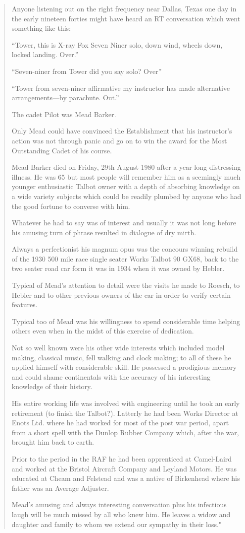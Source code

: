 \begin{quotation}
Anyone listening out on the right frequency near Dallas, Texas one day in the early nineteen forties might have heard an RT conversation which went something like this:

``Tower, this is X-ray Fox Seven Niner solo, down wind, wheels down, locked landing. Over.''

``Seven-niner from Tower did you say solo? Over''

``Tower from seven-niner affirmative my instructor has made alternative arrangements---by parachute. Out.''

The cadet Pilot was Mead Barker.

Only Mead could have convinced the Establishment that his instructor's action was not through panic and go on to win the award for the Most Outstanding Cadet of his course.

Mead Barker died on Friday, 29th August 1980 after a year long distressing illness. He was 65 but most people will remember him as a seemingly much younger enthusiastic Talbot owner with a depth of absorbing knowledge on a wide variety subjects which could be readily plumbed by anyone who had the good fortune to converse with him.

Whatever he had to say was of interest and usually it was not long before his amusing turn of phrase resulted in dialogue of dry mirth.

Always a perfectionist his magnum opus was the concours winning rebuild of the 1930 500 mile race single seater Works Talbot 90 GX68, back to the two seater road car form it was in 1934 when it was owned by Hebler.

Typical of Mead's attention to detail were the visits he made to Roesch, to Hebler and to other previous owners of the car in order to verify certain features.

Typical too of Mead was his willingness to spend considerable time helping others even when in the midst of this exercise of dedication.

Not so well known were his other wide interests which included model making, classical music, fell walking and clock making; to all of these he applied himself with considerable skill. He possessed a prodigious memory and could shame continentals with the accuracy of his interesting knowledge of their history.

His entire working life was involved with engineering until he took an early retirement (to finish the Talbot?). Latterly he had been Works Director at Enots Ltd. where he had worked for most of the post war period, apart from a short spell with the Dunlop Rubber Company which, after the war, brought him back to earth.

Prior to the period in the RAF he had been apprenticed at Camel-Laird and worked at the Bristol Aircraft Company and Leyland Motors. He was educated at Cheam and Felstead and was a native of Birkenhead where his father was an Average Adjuster.

Mead's amusing and always interesting conversation plus his infectious laugh will be much missed by all who knew him. He leaves a widow and daughter and family to whom we extend our sympathy in their loss."
\end{quotation}
